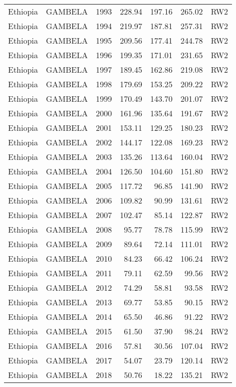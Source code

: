 \begin{longtable}{lllrrrl}
  Ethiopia & GAMBELA & 1993 & 228.94 & 197.16 & 265.02 & RW2 \\ 
  Ethiopia & GAMBELA & 1994 & 219.97 & 187.81 & 257.31 & RW2 \\ 
  Ethiopia & GAMBELA & 1995 & 209.56 & 177.41 & 244.78 & RW2 \\ 
  Ethiopia & GAMBELA & 1996 & 199.35 & 171.01 & 231.65 & RW2 \\ 
  Ethiopia & GAMBELA & 1997 & 189.45 & 162.86 & 219.08 & RW2 \\ 
  Ethiopia & GAMBELA & 1998 & 179.69 & 153.25 & 209.22 & RW2 \\ 
  Ethiopia & GAMBELA & 1999 & 170.49 & 143.70 & 201.07 & RW2 \\ 
  Ethiopia & GAMBELA & 2000 & 161.96 & 135.64 & 191.67 & RW2 \\ 
  Ethiopia & GAMBELA & 2001 & 153.11 & 129.25 & 180.23 & RW2 \\ 
  Ethiopia & GAMBELA & 2002 & 144.17 & 122.08 & 169.23 & RW2 \\ 
  Ethiopia & GAMBELA & 2003 & 135.26 & 113.64 & 160.04 & RW2 \\ 
  Ethiopia & GAMBELA & 2004 & 126.50 & 104.60 & 151.80 & RW2 \\ 
  Ethiopia & GAMBELA & 2005 & 117.72 & 96.85 & 141.90 & RW2 \\ 
  Ethiopia & GAMBELA & 2006 & 109.82 & 90.99 & 131.61 & RW2 \\ 
  Ethiopia & GAMBELA & 2007 & 102.47 & 85.14 & 122.87 & RW2 \\ 
  Ethiopia & GAMBELA & 2008 & 95.77 & 78.78 & 115.99 & RW2 \\ 
  Ethiopia & GAMBELA & 2009 & 89.64 & 72.14 & 111.01 & RW2 \\ 
  Ethiopia & GAMBELA & 2010 & 84.23 & 66.42 & 106.24 & RW2 \\ 
  Ethiopia & GAMBELA & 2011 & 79.11 & 62.59 & 99.56 & RW2 \\ 
  Ethiopia & GAMBELA & 2012 & 74.29 & 58.81 & 93.58 & RW2 \\ 
  Ethiopia & GAMBELA & 2013 & 69.77 & 53.85 & 90.15 & RW2 \\ 
  Ethiopia & GAMBELA & 2014 & 65.50 & 46.86 & 91.22 & RW2 \\ 
  Ethiopia & GAMBELA & 2015 & 61.50 & 37.90 & 98.24 & RW2 \\ 
  Ethiopia & GAMBELA & 2016 & 57.81 & 30.56 & 107.04 & RW2 \\ 
  Ethiopia & GAMBELA & 2017 & 54.07 & 23.79 & 120.14 & RW2 \\ 
  Ethiopia & GAMBELA & 2018 & 50.76 & 18.22 & 135.21 & RW2 \\ 

\end{longtable}
